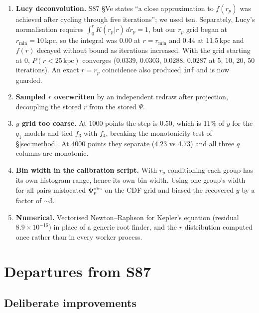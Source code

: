 \documentclass[11pt]{article}
\begin{document}
\begin{enumerate}
        the ensemble jointly in $r_p$ and $\Psi_p$ and slices at each pair's
        $r_{p,i}$. We had used the marginal $\Psi_p$ distribution.
  \item \textbf{Lucy deconvolution.} S87 \S Ve states ``a close approximation
        to $f(r_p)$ was achieved after cycling through five iterations''; we
        used ten. Separately, Lucy's normalisation requires
        $\int_0^r K(r_p|r)\,dr_p = 1$, but our $r_p$ grid began at
        $r_{\min}=10$\,kpc, so the integral was 0.00 at $r=r_{\min}$ and 0.44
        at 11.5\,kpc and $f(r)$ decayed without bound as iterations increased.
        With the grid starting at 0, $P(r<25\,\mathrm{kpc})$ converges
        (0.0339, 0.0303, 0.0288, 0.0287 at 5, 10, 20, 50 iterations). An exact
        $r = r_p$ coincidence also produced \texttt{inf} and is now guarded.
  \item \textbf{Sampled $r$ overwritten} by an independent redraw after
        projection, decoupling the stored $r$ from the stored $\Psi$.
  \item \textbf{$y$ grid too coarse.} At 1000 points the step is 0.50, which is
        11\% of $y$ for the $q_1$ models and tied $f_3$ with $f_4$, breaking
        the monotonicity test of \S\ref{sec:method}. At 4000 points they
        separate (4.23 vs 4.73) and all three $q$ columns are monotonic.
  \item \textbf{Bin width in the calibration script.} With $r_p$ conditioning
        each group has its own histogram range, hence its own bin width. Using
        one group's width for all pairs mislocated $\Psi_p^{\rm obs}$ on the
        CDF grid and biased the recovered $y$ by a factor of $\sim$3.
  \item \textbf{Numerical.} Vectorised Newton--Raphson for Kepler's equation
        (residual $8.9\times10^{-16}$) in place of a generic root finder, and
        the $r$ distribution computed once rather than in every worker process.
\end{enumerate}

\section{Departures from S87}
\label{sec:dev}

\subsection{Deliberate improvements}
\end{document}
